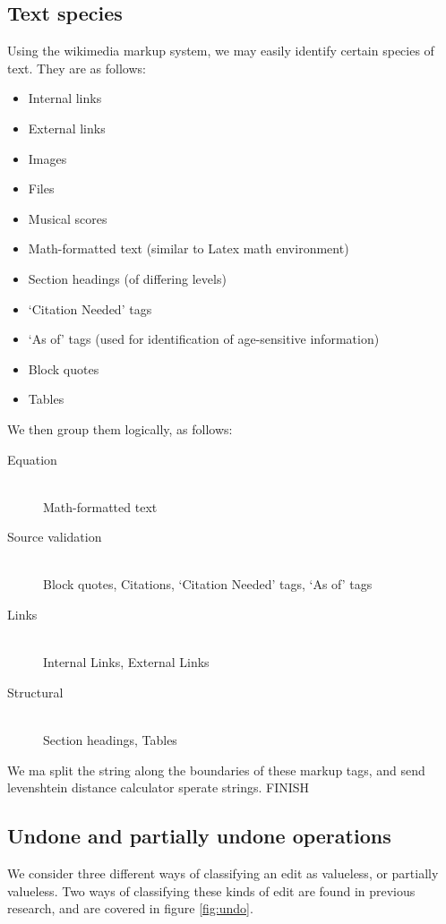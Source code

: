 \subsection*{Text species}
Using the wikimedia markup system, we may easily identify certain
species of text. They are as follows:
\begin{itemize}
\item Internal links
\item External links
\item Images
\item Files
\item Musical scores
\item Math-formatted text (similar to Latex math environment)
\item Section headings (of differing levels)
\item `Citation Needed' tags
\item `As of' tags (used for identification of age-sensitive
  information)
\item Block quotes
\item Tables
\end{itemize}

We then group them logically, as follows:
\begin{description}
  \item[Equation]\hfill\\
    Math-formatted text
  \item[Source validation]\hfill\\
    Block quotes, Citations, `Citation Needed' tags, `As of' tags
  \item[Links]\hfill\\
    Internal Links, External Links
  \item[Structural]\hfill\\
    Section headings, Tables
\end{description}

We ma split the string along the boundaries of these markup tags, and
send levenshtein distance calculator sperate strings.
FINISH

\subsection*{Undone and partially undone operations}
We consider three different ways of classifying an edit as valueless,
or partially valueless. Two ways of classifying these kinds of edit
are found in previous research, and are covered in figure
\ref{fig:undo}.


